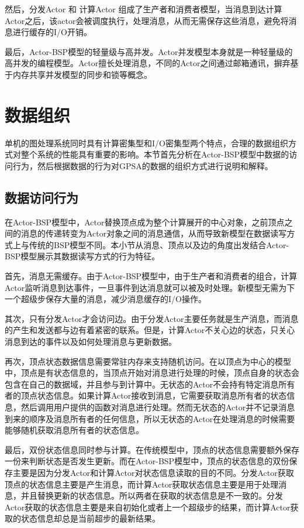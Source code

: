 然后，分发Actor 和 计算Actor 组成了生产者和消费者模型，当消息到达计算Actor之后，该actor会被调度执行，处理消息，从而无需保存这些消息，避免将消息进行缓存的I/O开销。

最后，Actor-BSP模型的轻量级与高并发。Actor并发模型本身就是一种轻量级的高并发的编程模型。Actor擅长处理消息，不同的Actor之间通过邮箱通讯，摒弃基于内存共享并发模型的同步和锁等概念。


\section{数据组织}

单机的图处理系统同时具有计算密集型和I/O密集型两个特点，合理的数据组织方式对整个系统的性能具有重要的影响。本节首先分析在Actor-BSP模型中数据的访问行为，然后根据数据的行为对GPSA的数据的组织方式进行说明和解释。

\subsection{数据访问行为}
在Actor-BSP模型中，Actor替换顶点成为整个计算展开的中心对象，之前顶点之间的消息的传递转变为Actor对象之间的消息通信，从而导致新模型在数据读写方式上与传统的BSP模型不同。本小节从消息、顶点以及边的角度出发结合Actor-BSP模型展示其数据读写方式的行为特征。

首先，消息无需缓存。由于Actor-BSP模型中，由于生产者和消费者的组合，计算Actor监听消息到达事件，一旦事件到达消息就可以被及时处理。新模型无需为下一个超级步保存大量的消息，减少消息缓存的I/O操作。

其次，只有分发Actor才会访问边。由于分发Actor主要任务就是生产消息，而消息的产生和发送都与边有着紧密的联系。但是，计算Actor不关心边的状态，只关心消息到达的事件以及如何处理消息与更新数据。

再次，顶点状态数据信息需要常驻内存来支持随机访问。在以顶点为中心的模型中，顶点是有状态信息的，当顶点开始对消息进行处理的时候，顶点自身的状态会包含在自己的数据域，并且参与到计算中。无状态的Actor不会持有特定消息所有者的顶点状态信息。如果计算Actor接收到消息，它需要获取消息所有者的状态信息，然后调用用户提供的函数对消息进行处理。然而无状态的Actor并不记录消息到来的顺序及消息所有者的任何信息，所以无状态的Actor在处理消息的时候需要能够随机获取消息所有者的状态信息。

最后，双份状态信息同时参与计算。在传统模型中，顶点的状态信息需要额外保存一份来判断状态是否发生更新。而在Actor-BSP模型中，顶点的状态信息的双份保存主要是因为分发Actor和计算Actor对状态信息读取的目的不同。分发Actor获取顶点的状态信息主要是产生消息，而计算Actor获取状态信息主要是用于处理消息，并且替换更新的状态信息。所以两者在获取的状态信息是不一致的。分发Actor获取的状态信息主要是来自初始化或者上一个超级步的结果，而计算Actor获取的状态信息却总是当前超步的最新结果。



